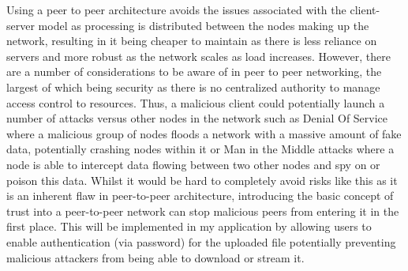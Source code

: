 \documentclass[]{report}
\begin{document}
	Using a peer to peer architecture avoids the issues associated with the client-server model as processing is distributed between the nodes making up the network, resulting in it being cheaper to maintain as there is less reliance on servers and more robust as the network scales as load increases. However, there are a number of considerations to be aware of in peer to peer networking, the largest of which being security as there is no centralized authority to manage access control to resources. Thus, a malicious client could potentially launch a number of attacks versus other nodes in the network such as Denial Of Service where a malicious group of nodes floods a network with a massive amount of fake data, potentially crashing nodes within it or Man in the Middle  attacks where a node is able to intercept data flowing between two other nodes and spy on or poison this data\cite{P2P Security Issues}. Whilst it would be hard to completely avoid risks like this as it is an inherent flaw in peer-to-peer architecture, introducing the basic concept of trust into a peer-to-peer network can stop malicious peers from entering it in the first place. This will be implemented in my application by allowing users to enable authentication (via password) for the uploaded file potentially preventing malicious attackers from being able to download or stream it. 
	
\end{document}
